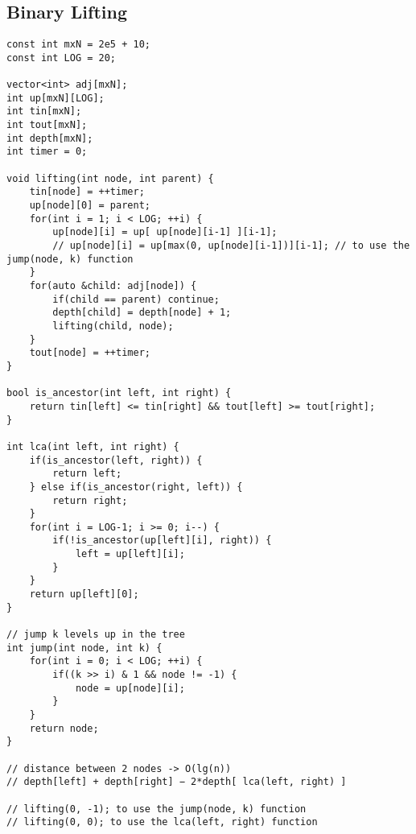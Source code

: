 \documentclass[10pt,letterpaper,twocolumn,twosided]{article}
\begin{document}
\subsection{Binary Lifting}
\begin{lstlisting}
const int mxN = 2e5 + 10;
const int LOG = 20;

vector<int> adj[mxN];
int up[mxN][LOG];
int tin[mxN];
int tout[mxN];
int depth[mxN];
int timer = 0;

void lifting(int node, int parent) {
    tin[node] = ++timer;
    up[node][0] = parent;
    for(int i = 1; i < LOG; ++i) {
        up[node][i] = up[ up[node][i-1] ][i-1];
        // up[node][i] = up[max(0, up[node][i-1])][i-1]; // to use the jump(node, k) function
    }
    for(auto &child: adj[node]) {
        if(child == parent) continue;
        depth[child] = depth[node] + 1;
        lifting(child, node);
    }
    tout[node] = ++timer;
}

bool is_ancestor(int left, int right) {
    return tin[left] <= tin[right] && tout[left] >= tout[right];
}

int lca(int left, int right) {
    if(is_ancestor(left, right)) {
        return left;
    } else if(is_ancestor(right, left)) {
        return right;
    }
    for(int i = LOG-1; i >= 0; i--) {
        if(!is_ancestor(up[left][i], right)) {
            left = up[left][i];
        }
    }
    return up[left][0];
}

// jump k levels up in the tree
int jump(int node, int k) {
    for(int i = 0; i < LOG; ++i) {
        if((k >> i) & 1 && node != -1) {
            node = up[node][i];
        }
    }
    return node;
}

// distance between 2 nodes -> O(lg(n))
// depth[left] + depth[right] − 2*depth[ lca(left, right) ]

// lifting(0, -1); to use the jump(node, k) function
// lifting(0, 0); to use the lca(left, right) function
\end{lstlisting}
\end{document}
